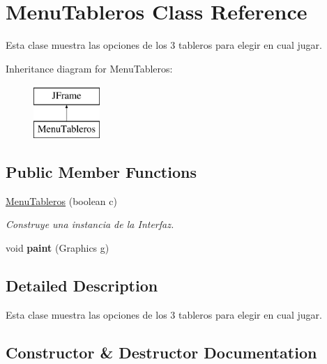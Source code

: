 \hypertarget{class_menu_tableros}{}\section{Menu\+Tableros Class Reference}
\label{class_menu_tableros}


Esta clase muestra las opciones de los 3 tableros para elegir en cual jugar.  


Inheritance diagram for Menu\+Tableros\+:\begin{figure}[H]
\begin{center}
\leavevmode
\includegraphics[height=2.000000cm]{class_menu_tableros}
\end{center}
\end{figure}
\subsection*{Public Member Functions}
\begin{DoxyCompactItemize}
\item 
\mbox{\hyperlink{class_menu_tableros_a1cb8d60a9dd5696979e8388106845bcd}{Menu\+Tableros}} (boolean c)
\begin{DoxyCompactList}\small\item\em Construye una instancia de la Interfaz. \end{DoxyCompactList}\item 
\mbox{\label{class_menu_tableros_abca0554cdf42215b9bc20c16c0a52f2d}} 
void {\bfseries paint} (Graphics g)
\end{DoxyCompactItemize}


\subsection{Detailed Description}
Esta clase muestra las opciones de los 3 tableros para elegir en cual jugar. 

\subsection{Constructor \& Destructor Documentation}
\mbox{\label{class_menu_tableros_a1cb8d60a9dd5696979e8388106845bcd}} 
